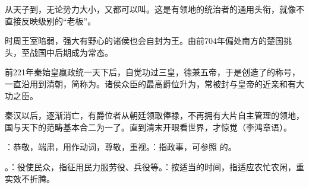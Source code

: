 {{\begin{lyenumerate}
从天子到，无论势力大小，又都可以叫。这是有领地的统治者的通用头衔，就像不直接反映级别的“老板”。

时周王室暗弱，强大有野心的诸侯也会自封为王。由前704年偏处南方的楚国挑头，至战国中后期成为常态。%

\item {}前221年秦始皇嬴政统一天下后，自觉功过三皇，德兼五帝，于是创造了的称号，一直沿用到清朝，简称为。诸侯众臣的最高爵位升为，常被封与皇帝的近亲和有大功之臣。

秦汉以后，逐渐消亡，有爵位者从朝廷领取俸禄，不再拥有大片自主管理的领地，国与天下的范畴基本合二为一了。直到清末开眼看世界，才惊觉（李鸿章语）。
\end{lyenumerate}
}

\item {}：恭敬，端肃，用作动词，尊敬，重视。：指政事，可参照  的。
\item {}。：役使民众，指征用民力服劳役、兵役等。：按适当的时间，指适应农忙农闲，重实效不折腾。
}
{}



